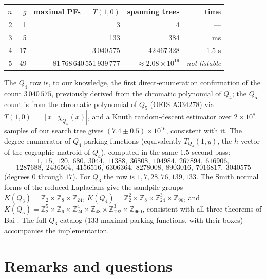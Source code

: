 \documentclass[11pt]{amsart}
\theoremstyle{definition}
\newcommand{\ZZ}{\mathbb{Z}}
\begin{document}
\begin{center}
\begin{tabular}{rrrrr}
\toprule
$n$ & $g$ & maximal PFs $=T(1,0)$ & spanning trees & time \\
\midrule
2 & 1  & 3 & 4 & --- \\
3 & 5  & 133 & 384 & ms \\
4 & 17 & 3\,040\,575 & 42\,467\,328 & 1.5 s \\
5 & 49 & 81\,768\,640\,551\,939\,777 & $\approx 2.08\times10^{19}$ &
  \emph{not listable} \\
\bottomrule
\end{tabular}
\end{center}

The $Q_4$ row is, to our knowledge, the first direct-enumeration
confirmation of the count $3\,040\,575$, previously derived from the
chromatic polynomial of $Q_4$; the $Q_5$ count is from the chromatic
polynomial of $Q_5$ (OEIS A334278) via
$T(1,0) = |[x]\,\chi_{Q_n}(x)|$, and a Knuth random-descent estimator over
$2\times10^8$ samples of our search tree gives
$(7.4\pm0.5)\times10^{16}$, consistent with it. The degree enumerator of
$Q_4$-parking functions (equivalently $T_{Q_4}(1,y)$, the $h$-vector of the
cographic matroid of $Q_4$), computed in the same $1.5$-second pass:
\[
1,\ 15,\ 120,\ 680,\ 3044,\ 11388,\ 36808,\ 104984,\ 267894,\ 616906,
\]
\[
1287688,\ 2436504,\ 4156516,\ 6306364,\ 8278008,\ 8903016,\ 7016817,\
3040575
\]
(degrees $0$ through $17$). For $Q_3$ the row is
$1, 7, 28, 76, 139, 133$. The Smith normal forms of the reduced Laplacians
give the sandpile groups
$K(Q_3)=\ZZ_2\times\ZZ_8\times\ZZ_{24}$,
$K(Q_4)=\ZZ_2^2\times\ZZ_8\times\ZZ_{24}^3\times\ZZ_{96}$, and
$K(Q_5)=\ZZ_2^5\times\ZZ_6\times\ZZ_{24}^4\times\ZZ_{48}
 \times\ZZ_{192}^3\times\ZZ_{960}$,
consistent with all three theorems of Bai \cite{bai}. The full $Q_3$
catalog ($133$ maximal parking functions, with their boxes) accompanies the
implementation.

\section{Remarks and questions}
\end{document}
